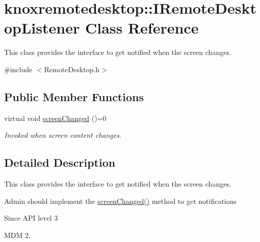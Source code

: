 \hypertarget{classknoxremotedesktop_1_1IRemoteDesktopListener}{\section{knoxremotedesktop\-:\-:\-I\-Remote\-Desktop\-Listener \-Class \-Reference}
\label{classknoxremotedesktop_1_1IRemoteDesktopListener}
}


\-This class provides the interface to get notified when the screen changes.  




{\ttfamily \#include $<$\-Remote\-Desktop.\-h$>$}

\subsection*{\-Public \-Member \-Functions}
\begin{DoxyCompactItemize}
\item 
virtual void \hyperlink{classknoxremotedesktop_1_1IRemoteDesktopListener_a737ab352cec0a7dc249da5519a8e14b0}{screen\-Changed} ()=0
\begin{DoxyCompactList}\small\item\em \-Invoked when screen content changes. \end{DoxyCompactList}\end{DoxyCompactItemize}


\subsection{\-Detailed \-Description}
\-This class provides the interface to get notified when the screen changes. 

\-Admin should implement the \hyperlink{classknoxremotedesktop_1_1IRemoteDesktopListener_a737ab352cec0a7dc249da5519a8e14b0}{screen\-Changed()} method to get notifications

\begin{DoxySince}{\-Since}
\-A\-P\-I level 3

\-M\-D\-M 2. 
\end{DoxySince}


